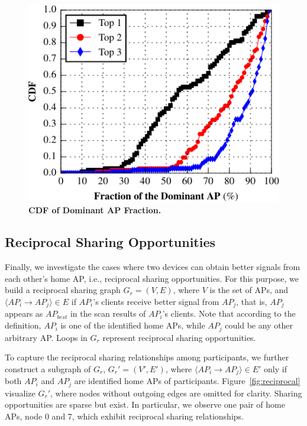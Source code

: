 \begin{figure}[t]
  \centering
  \includegraphics[width=\columnwidth]{./figures/DominantNeighborAPFigure.pdf}
  \caption{\textbf{CDF of Dominant AP Fraction.}}
  \label{fig:dominantap}
  \vspace*{-4mm}
\end{figure}

\subsection{Reciprocal Sharing Opportunities}
\label{subsec:reciprocal}

Finally, we investigate the cases where two devices can obtain better signals
from each other's home AP, i.e., reciprocal sharing opportunities. For this
purpose, we build a reciprocal sharing graph $G_r=(V, E)$, where $V$ is the set
of APs, and $\langle AP_i \rightarrow AP_j \rangle \in E$ if $AP_i$'s clients
receive better signal from $AP_j$, that is, $AP_j$ appears as $AP_{best}$ in the
scan results of $AP_i$'s clients. Note that according to the definition, $AP_i$
is one of the identified home APs, while $AP_j$ could be any other arbitrary AP.
Loops in $G_r$ represent reciprocal sharing opportunities.

To capture the reciprocal sharing relationships among \PhoneLab{} participants,
we further construct a subgraph of $G_r$, $G_r'=(V', E')$, where $\langle AP_i
\rightarrow AP_j \rangle \in E'$ only if both $AP_i$ and $AP_j$ are identified
home APs of \PhoneLab{} participants. Figure~\ref{fig:reciprocal} visualize
$G_r'$, where nodes without outgoing edges are omitted for clarity. Sharing
opportunities are sparse but exist. In particular, we observe one pair of home
APs, node 0 and 7, which exhibit reciprocal sharing relationships.

